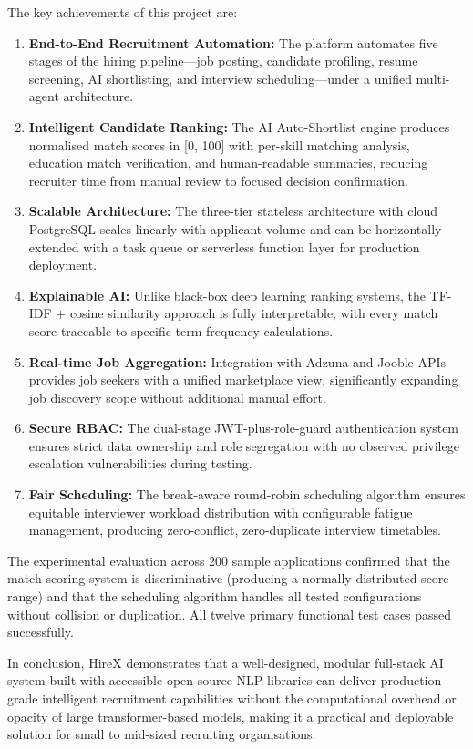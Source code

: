 \documentclass[12pt,a4paper]{report}
\begin{document}
The key achievements of this project are:
\begin{enumerate}[leftmargin=*, label=\arabic*., itemsep=3pt]
    \item \textbf{End-to-End Recruitment Automation:} The platform automates five stages of the hiring pipeline---job posting, candidate profiling, resume screening, AI shortlisting, and interview scheduling---under a unified multi-agent architecture.
    \item \textbf{Intelligent Candidate Ranking:} The AI Auto-Shortlist engine produces normalised match scores in [0, 100] with per-skill matching analysis, education match verification, and human-readable summaries, reducing recruiter time from manual review to focused decision confirmation.
    \item \textbf{Scalable Architecture:} The three-tier stateless architecture with cloud PostgreSQL scales linearly with applicant volume and can be horizontally extended with a task queue or serverless function layer for production deployment.
    \item \textbf{Explainable AI:} Unlike black-box deep learning ranking systems, the TF-IDF + cosine similarity approach is fully interpretable, with every match score traceable to specific term-frequency calculations.
    \item \textbf{Real-time Job Aggregation:} Integration with Adzuna and Jooble APIs provides job seekers with a unified marketplace view, significantly expanding job discovery scope without additional manual effort.
    \item \textbf{Secure RBAC:} The dual-stage JWT-plus-role-guard authentication system ensures strict data ownership and role segregation with no observed privilege escalation vulnerabilities during testing.
    \item \textbf{Fair Scheduling:} The break-aware round-robin scheduling algorithm ensures equitable interviewer workload distribution with configurable fatigue management, producing zero-conflict, zero-duplicate interview timetables.
\end{enumerate}

The experimental evaluation across 200 sample applications confirmed that the match scoring system is discriminative (producing a normally-distributed score range) and that the scheduling algorithm handles all tested configurations without collision or duplication. All twelve primary functional test cases passed successfully.

In conclusion, HireX demonstrates that a well-designed, modular full-stack AI system built with accessible open-source NLP libraries can deliver production-grade intelligent recruitment capabilities without the computational overhead or opacity of large transformer-based models, making it a practical and deployable solution for small to mid-sized recruiting organisations.
\end{document}
